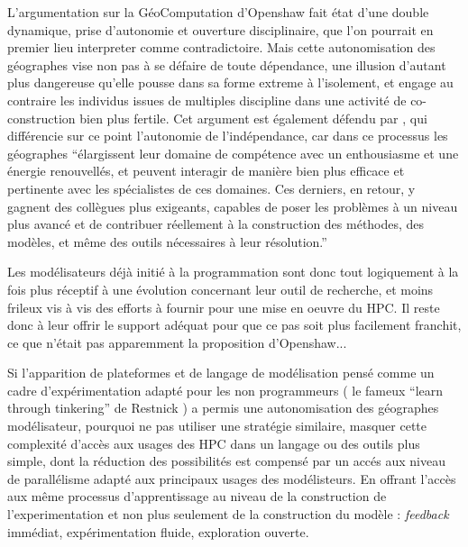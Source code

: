 L’argumentation sur la GéoComputation d’Openshaw fait état d’une double dynamique, prise d'autonomie et ouverture disciplinaire, que l’on pourrait en premier lieu interpreter comme contradictoire. Mais cette autonomisation des géographes vise non pas à se défaire de toute dépendance, une illusion d’autant plus dangereuse qu’elle pousse dans sa forme extreme à l’isolement, et engage au contraire les individus issues de multiples discipline dans une activité de co-construction bien plus fertile. Cet argument est également défendu par \autocite[64]{Banos2013}, qui différencie sur ce point l’autonomie de l’indépendance, car dans ce processus les géographes \enquote{élargissent leur domaine de compétence avec un enthousiasme et une énergie renouvellés, et peuvent interagir de manière bien plus efficace et pertinente avec les spécialistes de ces domaines. Ces derniers, en retour, y gagnent des collègues plus exigeants, capables de poser les problèmes à un niveau plus avancé et de contribuer réellement à la construction des méthodes, des modèles, et même des outils nécessaires à leur résolution.}

Les modélisateurs déjà initié à la programmation sont donc tout logiquement à la fois plus réceptif à une évolution concernant leur outil de recherche, et moins frileux vis à vis des efforts à fournir pour une mise en oeuvre du HPC. Il reste donc à leur offrir le support adéquat pour que ce pas soit plus facilement franchit, ce que n'était pas apparemment la proposition d'Openshaw...

Si l'apparition de plateformes et de langage de modélisation pensé comme un cadre d'expérimentation adapté pour les non programmeurs ( le fameux \foreignquote{english}{learn through tinkering} de Restnick ) a permis une autonomisation des géographes modélisateur, pourquoi ne pas utiliser une stratégie similaire, masquer cette complexité d'accès aux usages des HPC dans un langage ou des outils plus simple, dont la réduction des possibilités est compensé par un accés aux niveau de parallélisme adapté aux principaux usages des modélisteurs. En offrant l'accès aux même processus d'apprentissage au niveau de la construction de l'experimentation et non plus seulement de la construction du modèle : \textit{feedback} immédiat, expérimentation fluide, exploration ouverte.

